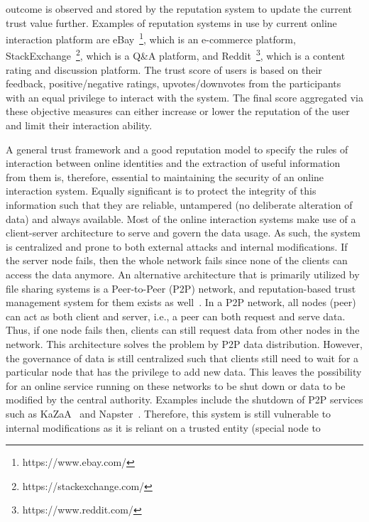 outcome is observed and stored by the reputation system to update the current
trust value further. Examples of reputation systems in use by current online
interaction platform are eBay~\footnote{https://www.ebay.com/}, which is an
e-commerce platform, StackExchange~\footnote{https://stackexchange.com/}, which
is a Q\&A platform, and Reddit~\footnote{https://www.reddit.com/}, which is a
content rating and discussion platform. The trust score of users is based on
their feedback, positive/negative ratings, upvotes/downvotes from the
participants with an equal privilege to interact with the system. The final
score aggregated via these objective measures can either increase or lower the
reputation of the user and limit their interaction ability. \par 

A general trust framework and a good reputation model to specify the rules of
interaction between online identities and the extraction of useful information
from them is, therefore, essential to maintaining the security of an online
interaction system. Equally significant is to protect the integrity of this
information such that they are reliable, untampered (no deliberate alteration
of data) and always available. Most of the online interaction systems make use
of a client-server architecture to serve and govern the data usage. As such,
the system is centralized and prone to both external attacks and internal
modifications. If the server node fails, then the whole network fails since
none of the clients can access the data anymore. An alternative architecture
that is primarily utilized by file sharing systems is a Peer-to-Peer (P2P)
network, and reputation-based trust management system for them exists as
well~\cite{selcuk2004reputation}. In a P2P network, all nodes (peer) can act as
both client and server, i.e., a peer can both request and serve data. Thus, if
one node fails then, clients can still request data from other nodes in the
network. This architecture solves the problem by P2P data distribution.
However, the governance of data is still centralized such that clients still
need to wait for a particular node that has the privilege to add new data. This
leaves the possibility for an online service running on these networks to be
shut down or data to be modified by the central authority. Examples include the
shutdown of P2P services such as KaZaA~\cite{mlcakova2004configuring} and
Napster~\cite{stern2000napster}. Therefore, this system is still vulnerable to
internal modifications as it is reliant on a trusted entity (special node to
